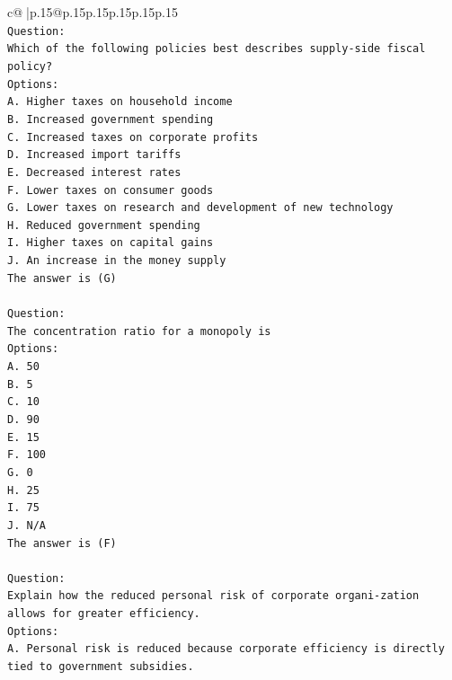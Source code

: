 \documentclass{article}
\begin{document}
{\begin{supertabular}{c@{$\;$}|p{.15\linewidth}@{}p{.15\linewidth}p{.15\linewidth}p{.15\linewidth}p{.15\linewidth}p{.15\linewidth}}
{{{\\ 
\texttt{Question:} \\
\texttt{Which of the following policies best describes supply{-}side fiscal policy?} \\
\texttt{Options:} \\
\texttt{A. Higher taxes on household income} \\
\texttt{B. Increased government spending} \\
\texttt{C. Increased taxes on corporate profits} \\
\texttt{D. Increased import tariffs} \\
\texttt{E. Decreased interest rates} \\
\texttt{F. Lower taxes on consumer goods} \\
\texttt{G. Lower taxes on research and development of new technology} \\
\texttt{H. Reduced government spending} \\
\texttt{I. Higher taxes on capital gains} \\
\texttt{J. An increase in the money supply} \\
\texttt{The answer is (G)} \\
\\ 
\texttt{Question:} \\
\texttt{The concentration ratio for a monopoly is} \\
\texttt{Options:} \\
\texttt{A. 50} \\
\texttt{B. 5} \\
\texttt{C. 10} \\
\texttt{D. 90} \\
\texttt{E. 15} \\
\texttt{F. 100} \\
\texttt{G. 0} \\
\texttt{H. 25} \\
\texttt{I. 75} \\
\texttt{J. N/A} \\
\texttt{The answer is (F)} \\
\\ 
\texttt{Question:} \\
\texttt{Explain how the reduced personal risk of corporate organi{-}zation allows for greater efficiency.} \\
\texttt{Options:} \\
\texttt{A. Personal risk is reduced because corporate efficiency is directly tied to government subsidies.} \\
}}}
\end{supertabular}}
\end{document}
